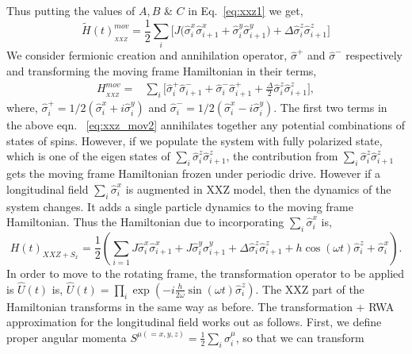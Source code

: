 \documentclass[aps,prb,reprint,showpacs,floatfix,superscriptaddress, onecolumn, nofootinbib, 9pt]{revtex4-2}
\begin{document}
\begin{enumerate}
{			Thus putting the values of $A, B$ \& $C$ in Eq.~\eqref{eq:xxz1} we get,
			\begin{equation}
			\tilde{H}(t)_{_{XXZ}}^{mov} = \frac12\sum_i\bigg[J\big(\hat{\sigma}^x_i\hat{\sigma}^x_{i+1} + \hat{\sigma}^y_i\hat{\sigma}^y_{i+1}\big) + \Delta\hat{\sigma}^z_i\hat{\sigma}^z_{i+1}\bigg]
			\label{eq:xxz_mov1}
			\end{equation}
		 We consider fermionic creation and annihilation operator, $\hat{\sigma}^+$ and $\hat{\sigma}^-$ respectively and transforming the moving frame Hamiltonian in their terms,
		\begin{align}
			H_{_{XXZ}}^{mov} =& \sum_i\Bigg[\hat{\sigma}^+_i \hat{\sigma}^-_{i+1} + \hat{\sigma}^-_i \hat{\sigma}^+_{i+1} + \frac{\Delta}{2} \hat{\sigma}^z_i \hat{\sigma}^z_{i+1}\Bigg],
			\label{eq:xxz_mov2}
		\end{align} 
		where, $\hat{\sigma}^+_i = 1/2(\hat{\sigma}^x_i + i\hat{\sigma}^y_i)$ and $\hat{\sigma}^-_i = 1/2(\hat{\sigma}^x_i - i\hat{\sigma}^y_i)$. The first two terms in the above eqn. ~\eqref{eq:xxz_mov2} annihilates together any potential combinations of states of spins. However, if we populate the system with fully polarized state, which is one of the eigen states of $\displaystyle \sum_i \hat{\sigma}^z_i \hat{\sigma}^z_{i+1}$, the contribution from $\displaystyle \sum_i \hat{\sigma}^z_i \hat{\sigma}^z_{i+1}$ gets the moving frame Hamiltonian frozen under periodic drive. However if a longitudinal field $\sum_i \hat{\sigma}^x_i$ is augmented in XXZ model, then the dynamics of the system changes. It adds a single particle dynamics to the moving frame Hamiltonian. Thus the Hamiltonian due to incorporating $\sum_i \hat{\sigma}^x_i$ is,
			\begin{equation*}
				H(t)_{XXZ + S_x} = \frac12 \left( \sum_{i=1} J \hat{\sigma}^x_i \hat{\sigma}^x_{i+1} +J  \hat{\sigma}^y_i \hat{\sigma}^y_{i+1} + \Delta \hat{\sigma}^z_i \hat{\sigma}^z_{i+1} + h\cos(\omega t) \hat{\sigma}^z_i + \hat{\sigma}^x_i\right).
				\label{eq:xxz_sx}
			\end{equation*}
			In order to move to the rotating frame, the transformation operator to be applied is $\displaystyle \hat{U}(t)$ is, $\hat{U}(t)=\prod_{i} \exp \left(-i \frac{h}{2 \omega} \sin (\omega t) \hat{\sigma}_{i}^{z}\right)$. The XXZ part of the Hamiltonian transforms in the same way as before.	The transformation + RWA approximation for the longitudinal field works out as follows. First, we define proper angular momenta $\displaystyle S^{\mu(=x,y,z)} = \frac12\sum_i \hat{\sigma}^\mu_i$, so that we can transform
}
\end{enumerate}
\end{document}

